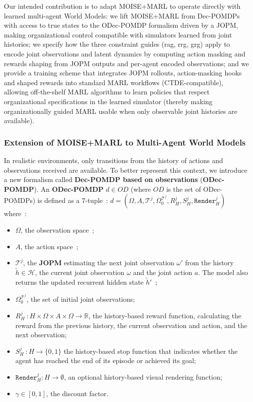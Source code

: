 \documentclass[pdflatex,sn-mathphys-num]{sn-jnl}%
\theoremstyle{thmstyleone}%
\theoremstyle{thmstyletwo}%
\theoremstyle{thmstylethree}%
\begin{document}
Our intended contribution is to adapt MOISE+MARL to operate directly with learned multi-agent World Models: we lift MOISE+MARL from Dec-POMDPs with access to true states to the ODec-POMDP formalism driven by a JOPM, making organizational control compatible with simulators learned from joint histories; we specify how the three constraint guides (rag, rrg, grg) apply to encode joint observations and latent dynamics by computing action masking and rewards shaping from JOPM outputs and per-agent encoded observations; and we provide a training scheme that integrates JOPM rollouts, action-masking hooks and shaped rewards into standard MARL workflows (CTDE-compatible), allowing off-the-shelf MARL algorithms to learn policies that respect organizational specifications in the learned simulator (thereby making organizationally guided MARL usable when only observable joint histories are available).


\subsubsection*{Extension of MOISE+MARL to Multi-Agent World Models}
\label{sec:multi_agent_world_models}

\noindent In realistic environments, only transitions from the history of actions and observations received are available. To better represent this context, we introduce a new formalism called \textbf{\textbf{Dec-POMDP} based on observations} (\textbf{ODec-POMDP}). An \textbf{ODec-POMDP} $d \in OD$ (where $OD$ is the set of ODec-POMDPs) is defined as a 7-tuple~:
%
$d = (\Omega, A, \mathcal{T}^j, \Omega^{\mathcal{T}^j}_0, R^j_H, S^j_H, \texttt{Render}^j_H)$
%
where~:
\begin{itemize}
    \item $\Omega$, the observation space~;
    \item $A$, the action space~;
    \item $\mathcal{T}^j$, the \textbf{JOPM} estimating the next joint observation $\omega'$ from the history $\tilde{h} \in \mathcal{H}$, the current joint observation $\omega$ and the joint action $a$. The model also returns the updated recurrent hidden state $\tilde{h}'$~;
    \item $\Omega^{\mathcal{T}^j}_0$, the set of initial joint observations;
    \item $R^j_H~: H \times \Omega \times A \times \Omega \rightarrow \mathbb{R}$, the history-based reward function, calculating the reward from the previous history, the current observation and action, and the next observation;
    \item $S^j_H~: H \rightarrow \{0,1\}$ the history-based stop function that indicates whether the agent has reached the end of its episode or achieved its goal;
    \item $\texttt{Render}^j_H : H \rightarrow \emptyset$, an optional history-based visual rendering function;
    \item $\gamma \in [0, 1]$, the discount factor.
\end{itemize}
\end{document}
